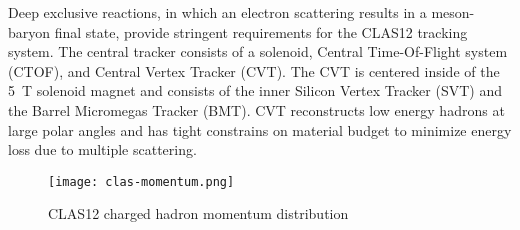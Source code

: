 Deep exclusive reactions, in which an electron scattering results in a meson-baryon final state, provide stringent requirements for the CLAS12 tracking system. The central tracker consists of a solenoid, Central Time-Of-Flight system (CTOF), and Central Vertex Tracker (CVT). The CVT is centered inside of the  5~T solenoid magnet and consists of the inner Silicon Vertex Tracker (SVT) and the Barrel Micromegas Tracker (BMT). CVT reconstructs low energy hadrons at large polar angles and has tight constrains on material budget to minimize energy loss due to multiple scattering. 

\begin{wrapfigure}{l}{0.5\columnwidth}
\texttt{[image: clas-momentum.png]}
\caption{CLAS12 charged hadron momentum distribution}
\label{fig:clas-momentum}
\end{wrapfigure}

